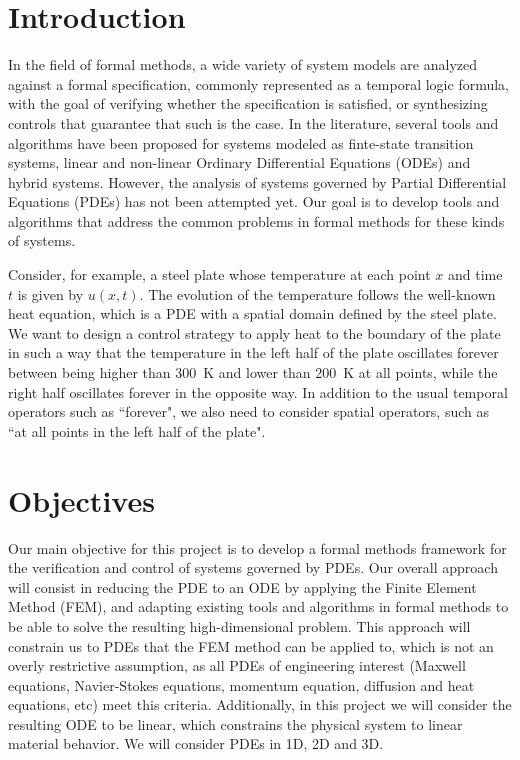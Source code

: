 \documentclass{article}
\begin{document}
\section{Introduction}
\label{sec:introduction}

In the field of formal methods, a wide variety of system models are analyzed 
against a formal specification, commonly represented as a temporal logic
formula, with the goal of verifying whether the specification is satisfied, or
synthesizing controls that guarantee that such is the case. In the literature,
several tools and algorithms have been proposed for systems modeled as
finte-state transition systems, linear and non-linear Ordinary Differential
Equations (ODEs) and hybrid systems.  However, the analysis of systems governed
by Partial Differential Equations (PDEs) has not been attempted yet. Our goal is
to develop tools and algorithms that address the common problems in formal
methods for these kinds of systems.

Consider, for example, a steel plate whose temperature at each point $x$ and
time $t$ is given by $u(x, t)$. The evolution of the temperature follows the
well-known heat equation, which is a PDE with a spatial domain defined by the
steel plate. We want to design a control strategy
to apply heat to the boundary of the plate in such a way that the temperature in
the left half of the plate oscillates forever between being higher than \SI{300}{\kelvin} 
and lower than \SI{200}{\kelvin} at all points, while the right half oscillates forever in the
opposite way. In addition to the usual temporal operators such as ``forever", we
also need to consider spatial operators, such as ``at all points in the left
half of the plate".

\section{Objectives}
\label{sec:objectives}

Our main objective for this project is to develop a formal methods framework for
the verification and control of systems governed by PDEs. Our overall approach
will consist in reducing the PDE to an ODE by applying the Finite Element Method
(FEM), and adapting existing tools and algorithms in formal methods to be able
to solve the resulting high-dimensional problem. This approach will constrain us
to PDEs that the FEM method can be applied to, which is not an overly restrictive
assumption, as all PDEs of engineering interest (Maxwell equations, Navier-Stokes equations,
momentum equation, diffusion and heat equations, etc) meet this criteria.
Additionally, in this project we will consider the resulting ODE to be linear,
which constrains the physical system to linear material behavior. We will
consider PDEs in 1D, 2D and 3D.
\end{document}

